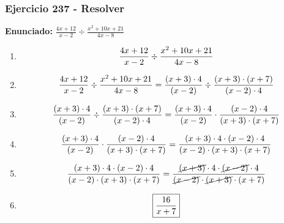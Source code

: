 \documentclass[11pt,a4paper]{article}
\newcommand{\fitmath}[1]{%
\[
\setbox0=\hbox{$\displaystyle #1$}%
\ifdim\wd0>\linewidth
\resizebox{\linewidth}{!}{$\displaystyle #1$}%
\else
#1%
\fi
\]
}
\begin{document}
\subsubsection*{Ejercicio 237 - Resolver}
\textbf{Enunciado:} $ \frac{4 x + 12}{x - 2} \div \frac{x^{2} + 10 x + 21}{4 x - 8} $\par
\begin{enumerate}[leftmargin=2em]
\item \fitmath{\frac{4 x + 12}{x - 2} \div \frac{x^{2} + 10 x + 21}{4 x - 8}}
\item \fitmath{\frac{4 x + 12}{x - 2} \div \frac{x^{2} + 10 x + 21}{4 x - 8}= \frac{\left(x + 3\right)\cdot 4}{\left(x - 2\right)} \div \frac{\left(x + 3\right)\cdot \left(x + 7\right)}{\left(x - 2\right)\cdot 4}}
\item \fitmath{\frac{\left(x + 3\right)\cdot 4}{\left(x - 2\right)}\div \frac{\left(x + 3\right)\cdot \left(x + 7\right)}{\left(x - 2\right)\cdot 4}= \frac{\left(x + 3\right)\cdot 4}{\left(x - 2\right)}\cdot \frac{\left(x - 2\right)\cdot 4}{\left(x + 3\right)\cdot \left(x + 7\right)}}
\item \fitmath{\frac{\left(x + 3\right)\cdot 4}{\left(x - 2\right)}\cdot \frac{\left(x - 2\right)\cdot 4}{\left(x + 3\right)\cdot \left(x + 7\right)}= \frac{\left(x + 3\right)\cdot 4\cdot \left(x - 2\right)\cdot 4}{\left(x - 2\right)\cdot \left(x + 3\right)\cdot \left(x + 7\right)}}
\item \fitmath{\frac{\left(x + 3\right)\cdot 4\cdot \left(x - 2\right)\cdot 4}{\left(x - 2\right)\cdot \left(x + 3\right)\cdot \left(x + 7\right)}= \frac{\cancel{\left(x + 3\right)}\cdot 4\cdot \cancel{\left(x - 2\right)}\cdot 4}{\cancel{\left(x - 2\right)}\cdot \cancel{\left(x + 3\right)}\cdot \left(x + 7\right)}}
\item \fitmath{\boxed{\frac{16}{x + 7}}}
\end{enumerate}

\vspace{0.12cm}
\end{document}
